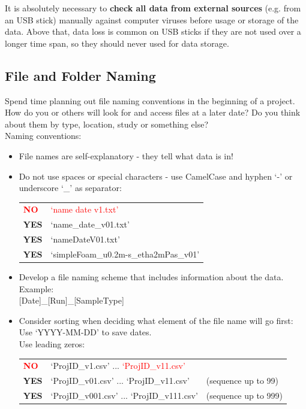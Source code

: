 It is absolutely necessary to \textbf{check all data from external sources} (e.g. from an USB stick) manually against computer viruses before usage or storage of the data. Above that, data loss is common on USB sticks if they are not used over a longer time span, so they should never used for data storage.


\subsection{File and Folder Naming}

Spend time planning out file naming conventions in the beginning of a project. How do you or others will look for and access files at a later date? Do you think about them by type, location, study or something else? \\[8pt]
Naming conventions:
\begin{itemize}
  \item File names are self-explanatory - they tell what data is in!
  \item Do not use spaces or special characters - use CamelCase and hyphen
        ‘-’ or underscore ‘\_’ as separator: \\
        \begin{tabular}{ll}
          \textcolor{red}{\textbf{NO}}  & \textcolor{red}{‘name date v1.txt’} \\
          \textbf{YES} & ‘name\_date\_v01.txt’ \\
          \textbf{YES} & ‘nameDateV01.txt’ \\
          \textbf{YES} & ‘simpleFoam\_u0.2m-s\_etha2mPas\_v01’ \\
        \end{tabular}
  \item Develop a file naming scheme that includes information about the data.
        Example: \\
        {[Date]}\_{[Run]}\_{[SampleType]}
  \item Consider sorting when deciding what element of the file name will
        go first: \\
        Use ‘YYYY-MM-DD’ to save dates. \\
        Use leading zeros: \\
        \begin{tabular}{lll}
          \textcolor{red}{\textbf{NO}}  & ‘ProjID\_v1.csv’  	...  	\textcolor{red}{‘ProjID\_v11.csv’} & \\
          \textbf{YES} & ‘ProjID\_v01.csv’ 	... 	‘ProjID\_v11.csv’
             & (sequence up to 99) \\
          \textbf{YES} & ‘ProjID\_v001.csv’ 	...	‘ProjID\_v111.csv’
             & (sequence up to 999) \\
        \end{tabular}
\end{itemize}

